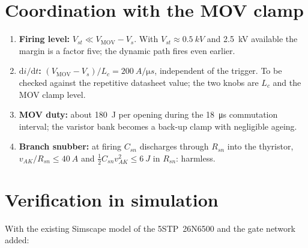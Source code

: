 \documentclass[11pt,a4paper]{article}
\begin{document}
\section{Coordination with the MOV clamp}

\begin{enumerate}
\item \textbf{Firing level:} $V_{st} \ll V_{\mathrm{MOV}} - V_s$. With $V_{st} \approx \SI{0.5}{kV}$
      and \SI{2.5}{kV} available the margin is a factor five; the dynamic path fires even
      earlier.
\item \textbf{$\mathrm{d}i/\mathrm{d}t$:} $(V_{\mathrm{MOV}} - V_s)/L_c = \SI{200}{A/\micro s}$,
      independent of the trigger. To be checked against the repetitive datasheet value; the two
      knobs are $L_c$ and the MOV clamp level.
\item \textbf{MOV duty:} about \SI{180}{J} per opening during the \SI{18}{\micro s} commutation
      interval; the varistor bank becomes a back-up clamp with negligible ageing.
\item \textbf{Branch snubber:} at firing $C_{sn}$ discharges through $R_{sn}$ into the thyristor,
      $v_{AK}/R_{sn} \le \SI{40}{A}$ and $\tfrac12 C_{sn} v_{AK}^2 \le \SI{6}{J}$ in $R_{sn}$:
      harmless.
\end{enumerate}

\section{Verification in simulation}

With the existing Simscape model of the 5STP~26N6500 and the gate network added:
\end{document}
